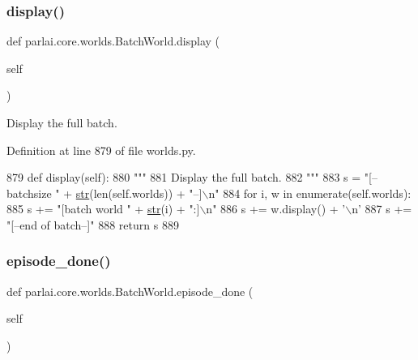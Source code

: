 \subsubsection{\texorpdfstring{display()}{display()}}
{\footnotesize\ttfamily def parlai.\+core.\+worlds.\+Batch\+World.\+display (\begin{DoxyParamCaption}\item[{}]{self }\end{DoxyParamCaption})}

\begin{DoxyVerb}Display the full batch.
\end{DoxyVerb}
 

Definition at line 879 of file worlds.\+py.


\begin{DoxyCode}
879     \textcolor{keyword}{def }display(self):
880         \textcolor{stringliteral}{"""}
881 \textcolor{stringliteral}{        Display the full batch.}
882 \textcolor{stringliteral}{        """}
883         s = \textcolor{stringliteral}{"[--batchsize "} + \hyperlink{namespacegenerate__task__READMEs_a5b88452ffb87b78c8c85ececebafc09f}{str}(len(self.worlds)) + \textcolor{stringliteral}{"--]\(\backslash\)n"}
884         \textcolor{keywordflow}{for} i, w \textcolor{keywordflow}{in} enumerate(self.worlds):
885             s += \textcolor{stringliteral}{"[batch world "} + \hyperlink{namespacegenerate__task__READMEs_a5b88452ffb87b78c8c85ececebafc09f}{str}(i) + \textcolor{stringliteral}{":]\(\backslash\)n"}
886             s += w.display() + \textcolor{stringliteral}{'\(\backslash\)n'}
887         s += \textcolor{stringliteral}{"[--end of batch--]"}
888         \textcolor{keywordflow}{return} s
889 
\end{DoxyCode}
\mbox{\label{classparlai_1_1core_1_1worlds_1_1BatchWorld_aa3ef1275372635073ba5cba7df0d1f5d}} 
\subsubsection{\texorpdfstring{episode\+\_\+done()}{episode\_done()}}
{\footnotesize\ttfamily def parlai.\+core.\+worlds.\+Batch\+World.\+episode\+\_\+done (\begin{DoxyParamCaption}\item[{}]{self }\end{DoxyParamCaption})}

